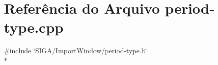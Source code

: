 \section{Referência do Arquivo period-\/type.cpp}
\label{period-type_8cpp}
{\ttfamily \#include \char`\"{}S\+I\+G\+A/\+Import\+Window/period-\/type.\+h\char`\"{}}\\*
